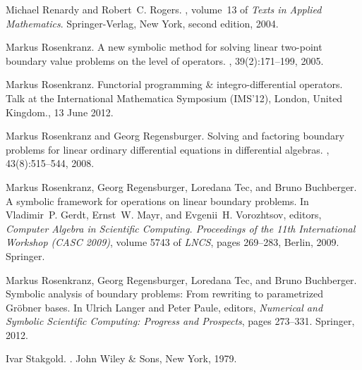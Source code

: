 \documentclass[a4paper]{llncs}
\begin{document}
\begin{thebibliography}{10}
Michael Renardy and Robert~C. Rogers.
, volume~13 of
  {\em Texts in Applied Mathematics}.
\newblock Springer-Verlag, New York, second edition, 2004.

Markus Rosenkranz.
\newblock A new symbolic method for solving linear two-point boundary value
  problems on the level of operators.
, 39(2):171--199, 2005.

Markus Rosenkranz.
\newblock Functorial programming \& integro-differential operators.
\newblock Talk at the International Mathematica Symposium (IMS'12), London,
  United Kingdom., 13 June 2012.

Markus Rosenkranz and Georg Regensburger.
\newblock Solving and factoring boundary problems for linear ordinary
  differential equations in differential algebras.
, 43(8):515--544, 2008.

Markus Rosenkranz, Georg Regensburger, Loredana Tec, and Bruno Buchberger.
\newblock A symbolic framework for operations on linear boundary problems.
\newblock In Vladimir~P. Gerdt, Ernst~W. Mayr, and Evgenii~H. Vorozhtsov,
  editors, {\em Computer Algebra in Scientific Computing. Proceedings of the
  11th International Workshop (CASC 2009)}, volume 5743 of {\em LNCS}, pages
  269--283, Berlin, 2009. Springer.

Markus Rosenkranz, Georg Regensburger, Loredana Tec, and Bruno Buchberger.
\newblock Symbolic analysis of boundary problems: {F}rom rewriting to
  parametrized {G}r{\"o}bner bases.
\newblock In Ulrich Langer and Peter Paule, editors, {\em Numerical and
  Symbolic Scientific Computing: Progress and Prospects}, pages 273--331.
  Springer, 2012.

Ivar Stakgold.
.
\newblock John Wiley \& Sons, New York, 1979.

\end{thebibliography}
\end{document}
